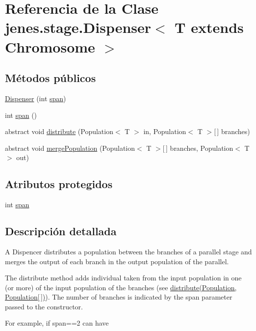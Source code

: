 \hypertarget{classjenes_1_1stage_1_1_dispenser_3_01_t_01extends_01_chromosome_01_4}{\section{Referencia de la Clase jenes.\-stage.\-Dispenser$<$ T extends Chromosome $>$}
\label{classjenes_1_1stage_1_1_dispenser_3_01_t_01extends_01_chromosome_01_4}
}
\subsection*{Métodos públicos}
\begin{DoxyCompactItemize}
\item 
\hyperlink{classjenes_1_1stage_1_1_dispenser_3_01_t_01extends_01_chromosome_01_4_a8972dc3bcea956122cc623784a833bcf}{Dispenser} (int \hyperlink{classjenes_1_1stage_1_1_dispenser_3_01_t_01extends_01_chromosome_01_4_a8f9bc0997e0536729db0c55bc9e240a5}{span})
\item 
int \hyperlink{classjenes_1_1stage_1_1_dispenser_3_01_t_01extends_01_chromosome_01_4_a6ece937f3d7564424f6367e96e1b21c7}{span} ()
\item 
abstract void \hyperlink{classjenes_1_1stage_1_1_dispenser_3_01_t_01extends_01_chromosome_01_4_ae9eb1e3be8a72e70e2bc75c53f31265b}{distribute} (Population$<$ T $>$ in, Population$<$ T $>$\mbox{[}$\,$\mbox{]} branches)
\item 
abstract void \hyperlink{classjenes_1_1stage_1_1_dispenser_3_01_t_01extends_01_chromosome_01_4_ae35fcd8e2c1ecf6c9069107122b8a894}{merge\-Population} (Population$<$ T $>$\mbox{[}$\,$\mbox{]} branches, Population$<$ T $>$ out)
\end{DoxyCompactItemize}
\subsection*{Atributos protegidos}
\begin{DoxyCompactItemize}
\item 
int \hyperlink{classjenes_1_1stage_1_1_dispenser_3_01_t_01extends_01_chromosome_01_4_a8f9bc0997e0536729db0c55bc9e240a5}{span}
\end{DoxyCompactItemize}


\subsection{Descripción detallada}
A Dispencer distributes a population between the branches of a parallel stage and merges the output of each branch in the output population of the parallel.\par
 \par
 The distribute method adds individual taken from the input population in one (or more) of the input population of the branches (see \hyperlink{}{distribute(\-Population, Population\mbox{[}$\,$\mbox{]})}). The number of branches is indicated by the span parameter passed to the constructor.\par
 \par
 For example, if span==2 can have\par
 

